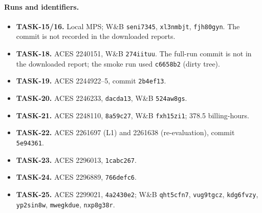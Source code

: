 \documentclass[10pt,letterpaper]{article}
\begin{document}
\paragraph{Runs and identifiers.}
\begin{itemize}
\item \textbf{TASK-15/16.} Local MPS; W\&B \texttt{seni7345}, \texttt{xl3nmbjt}, \texttt{fjh80gyn}. The commit is not recorded in the downloaded reports.
\item \textbf{TASK-18.} ACES 2240151, W\&B \texttt{274iituu}. The full-run commit is not in the downloaded report; the smoke run used \texttt{c6658b2} (dirty tree).
\item \textbf{TASK-19.} ACES 2244922--5, commit \texttt{2b4ef13}.
\item \textbf{TASK-20.} ACES 2246233, \texttt{dacda13}, W\&B \texttt{524aw8gs}.
\item \textbf{TASK-21.} ACES 2248110, \texttt{8a59c27}, W\&B \texttt{fxh15zi1}; 378.5 billing-hours.
\item \textbf{TASK-22.} ACES 2261697 (L1) and 2261638 (re-evaluation), commit \texttt{5e94361}.
\item \textbf{TASK-23.} ACES 2296013, \texttt{1cabc267}.
\item \textbf{TASK-24.} ACES 2296889, \texttt{766defc6}.
\item \textbf{TASK-25.} ACES 2299021, \texttt{4a2430e2}; W\&B \texttt{qht5cfn7}, \texttt{vug9tgcz}, \texttt{kdg6fvzy}, \texttt{yp2sin8w}, \texttt{mwegkdue}, \texttt{nxp8g38r}.
\end{itemize}
\end{document}
